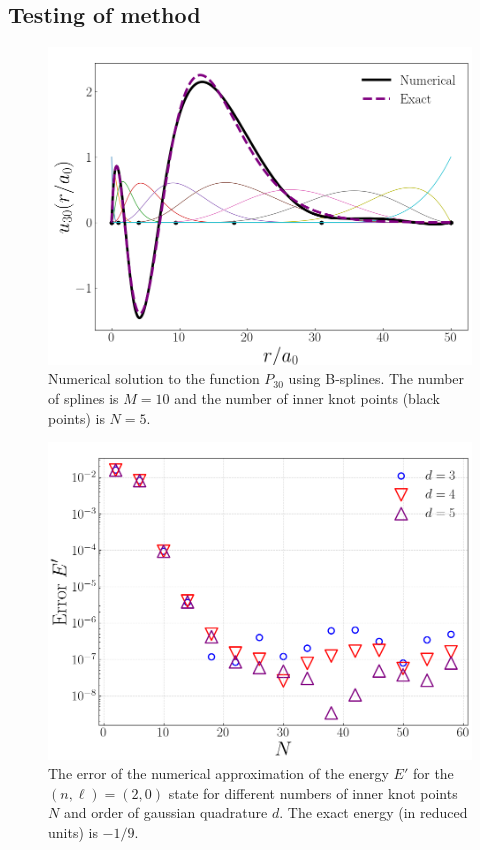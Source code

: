 \documentclass[twocolumn]{article}
\begin{document}
\begin{large}
\subsection*{Testing of method}
\begin{figure}[t!]
    \includegraphics[scale=0.35]{u20_splines.png}
    \caption{Numerical solution to the function $P_{30}$ using B-splines. The number of splines is $M=10$ and the number of inner knot points (black points) is $N=5$.}
    \label{27apr2045}
\end{figure}
\begin{figure}[h]
    \includegraphics[scale=0.35]{errorE_2.png}
    \caption{The error of the numerical approximation of the energy $E'$ for the $(n,\ell)=(2,0)$ state for different numbers of inner knot points $N$ and order of gaussian quadrature $d$. The exact energy (in reduced units) is $-1/9$.}

\end{figure}
\end{large}
\end{document}

